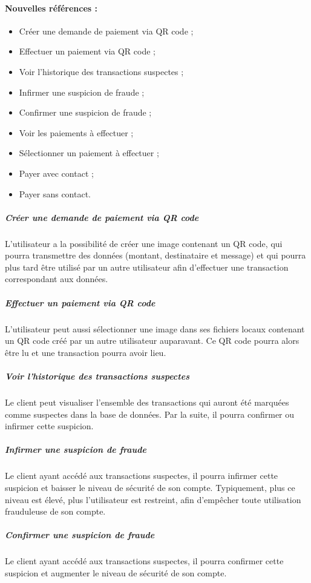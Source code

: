 \paragraph{Nouvelles références :}
\begin{itemize}
\item Créer une demande de paiement via QR code ;
\item Effectuer un paiement via QR code ;
\item Voir l'historique des transactions suspectes ;
\item Infirmer une suspicion de fraude ;
\item Confirmer une suspicion de fraude ;
\item Voir les paiements à effectuer ;
\item Sélectionner un paiement à effectuer ;
\item Payer avec contact ;
\item Payer sans contact.
\end{itemize}


\subparagraph{Créer une demande de paiement via QR code} L'utilisateur a la possibilité de créer une image contenant un QR code, qui pourra transmettre des données (montant, destinataire et message) et qui pourra plus tard être utilisé par un autre utilisateur afin d'effectuer une transaction correspondant aux données.


\subparagraph{Effectuer un paiement via QR code} L'utilisateur peut aussi sélectionner une image dans ses fichiers locaux contenant un QR code créé par un autre utilisateur auparavant. Ce QR code pourra alors être lu et une transaction pourra avoir lieu.


\subparagraph{Voir l'historique des transactions suspectes} Le client peut visualiser l'ensemble des transactions qui auront été marquées comme suspectes dans la base de données. Par la suite, il pourra confirmer ou infirmer cette suspicion.


\subparagraph{Infirmer une suspicion de fraude} Le client ayant accédé aux transactions suspectes, il pourra infirmer cette suspicion et baisser le niveau de sécurité de son compte. Typiquement, plus ce niveau est élevé, plus l'utilisateur est restreint, afin d'empêcher toute utilisation frauduleuse de son compte.


\subparagraph{Confirmer une suspicion de fraude} Le client ayant accédé aux transactions suspectes, il pourra confirmer cette suspicion et augmenter le niveau de sécurité de son compte.



